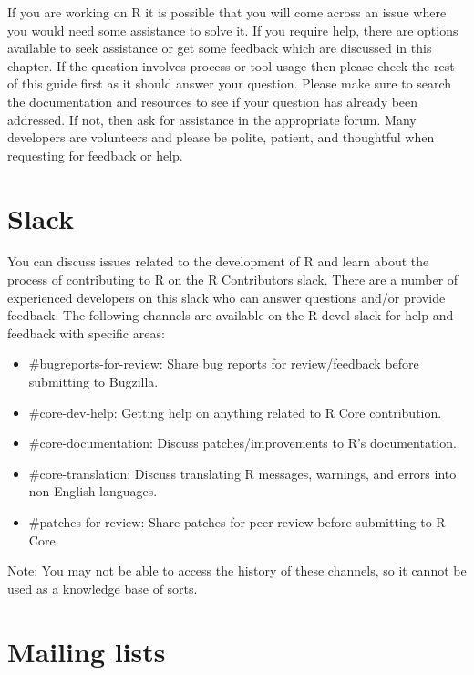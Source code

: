 \documentclass[
]{book}
\begin{document}
If you are working on R it is possible that you will come across an issue where you would need some assistance to solve it. If you require help, there are options available to seek assistance or get some feedback which are discussed in this chapter. If the question involves process or tool usage then please check the rest of this guide first as it should answer your question. Please make sure to search the documentation and resources to see if your question has already been addressed. If not, then ask for assistance in the appropriate forum. Many developers are volunteers and please be polite, patient, and thoughtful when requesting for feedback or help.

\hypertarget{slack}{%
\section{Slack}\label{slack}}

You can discuss issues related to the development of R and learn about the process of contributing to R on the \href{https://r-contributors.slack.com/}{R Contributors slack}. There are a number of experienced developers on this slack who can answer questions and/or provide feedback. The following channels are available on the R-devel slack for help and feedback with specific areas:

\begin{itemize}
\item
  \#bugreports-for-review: Share bug reports for review/feedback before submitting to Bugzilla.
\item
  \#core-dev-help: Getting help on anything related to R Core contribution.
\item
  \#core-documentation: Discuss patches/improvements to R's documentation.
\item
  \#core-translation: Discuss translating R messages, warnings, and errors into non-English languages.
\item
  \#patches-for-review: Share patches for peer review before submitting to R Core.
\end{itemize}

Note: You may not be able to access the history of these channels, so it cannot be used as a knowledge base of sorts.

\hypertarget{mailing-lists}{%
\section{Mailing lists}\label{mailing-lists}}
\end{document}

